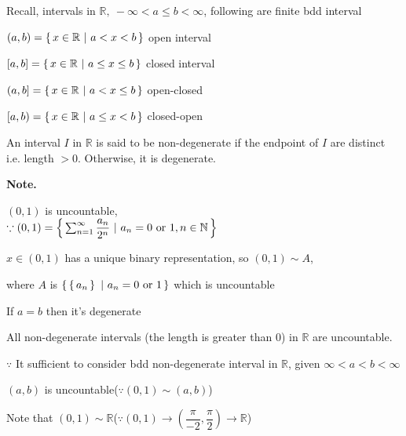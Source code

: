 Recall, intervals in $\mathbb R,~-\infty < a \leq b < \infty$, following are finite bdd interval

\begin{tcolorbox}
	$(a,b) = \left\{ \,x \in \mathbb R~|~a<x<b \,\right\}$  open interval
	
	$\left[a,b\right] = \left\{ \,x \in \mathbb R~|~a\leq x \leq b \,\right\}$ closed interval
	
	$\left(a,b\right] = \left\{ \,x\in \mathbb R~|~a < x \leq b \,\right\}$ open-closed
	
	$\left[a,b \right) = \left\{ \,x \in \mathbb R~|~a\leq x < b \,\right\}$ closed-open
\end{tcolorbox}

An interval $I$ in $\mathbb R$ is said to be non-degenerate if the endpoint of $I$ are distinct i.e. length $> 0$. Otherwise, it is degenerate.

\textbf{Note.}

\begin{tcolorbox}
	$(0,1)$ is uncountable, \\$\because (0,1) = \left\{ \,\sum^{\infty}_{n=1} \dfrac{a_n}{2^n}~|~a_n = 0 \text{ or } 1,n\in \mathbb N \,\right\}$
	
	$x \in (0,1)$ has a unique binary representation, so $(0,1) \sim A$, 
	
	where $A$ is $\left\{ \,\left\{ \,a_n \,\right\}~|~a_n = 0 \text{ or } 1 \,\right\}$ which is uncountable
\end{tcolorbox}

If $a = b$ then it's degenerate

All non-degenerate intervals (the length is greater than $0$) in $\mathbb R$ are uncountable.

$\because$ It sufficient to consider bdd non-degenerate interval in $\mathbb R$, given $\infty < a < b < \infty$

$(a,b)$ is uncountable($\because(0,1) \sim (a,b)$)

Note that $(0,1)\sim \mathbb R$($\because (0,1) \rightarrow (\dfrac{\pi}{-2},\dfrac{\pi}{2}) \rightarrow \mathbb R$)


